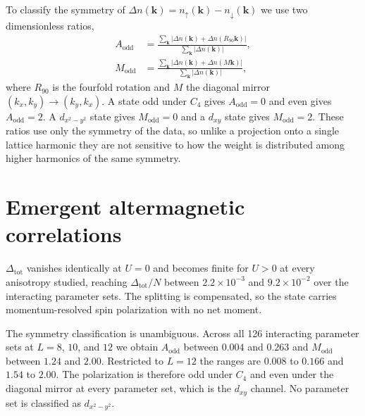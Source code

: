 \documentclass[aps,prb,reprint,superscriptaddress,amsmath,amssymb,floatfix]{revtex4-2}
\begin{document}
To classify the symmetry of $\Delta n(\bm{k}) = n_{\uparrow}(\bm{k}) - n_{\downarrow}(\bm{k})$
we use two dimensionless ratios,
\begin{align}
A_{\mathrm{odd}} &= \frac{\sum_{\bm{k}} \left| \Delta n(\bm{k}) + \Delta n(R_{90}\bm{k}) \right|}
                         {\sum_{\bm{k}} \left| \Delta n(\bm{k}) \right|},
\label{eq:aodd}\\
M_{\mathrm{odd}} &= \frac{\sum_{\bm{k}} \left| \Delta n(\bm{k}) + \Delta n(M\bm{k}) \right|}
                         {\sum_{\bm{k}} \left| \Delta n(\bm{k}) \right|},
\label{eq:modd}
\end{align}
where $R_{90}$ is the fourfold rotation and $M$ the diagonal mirror
$(k_x,k_y) \to (k_y,k_x)$. A state odd under $C_4$ gives
$A_{\mathrm{odd}} = 0$ and even gives $A_{\mathrm{odd}} = 2$. A $d_{x^2-y^2}$
state gives $M_{\mathrm{odd}} = 0$ and a $d_{xy}$ state gives
$M_{\mathrm{odd}} = 2$. These ratios use only the symmetry of the data, so
unlike a projection onto a single lattice harmonic they are not sensitive to
how the weight is distributed among higher harmonics of the same symmetry.


\section{Emergent altermagnetic correlations}
\label{sec:order}

$\Delta_{\mathrm{tot}}$ vanishes identically at $U = 0$ and becomes finite for
$U > 0$ at every anisotropy studied, reaching $\Delta_{\mathrm{tot}}/N$ between
$2.2\times10^{-3}$ and $9.2\times10^{-2}$ over the interacting parameter sets.
The splitting is compensated, so the state carries momentum-resolved spin
polarization with no net moment.

The symmetry classification is unambiguous. Across all 126 interacting parameter
sets at $L = 8$, $10$, and $12$ we obtain $A_{\mathrm{odd}}$ between $0.004$ and
$0.263$ and $M_{\mathrm{odd}}$ between $1.24$ and $2.00$.
Restricted to $L = 12$ the ranges are $0.008$ to $0.166$ and $1.54$ to $2.00$.
The polarization is therefore odd under $C_4$ and even under the diagonal
mirror at every parameter set, which is the $d_{xy}$ channel. No parameter set
is classified as $d_{x^2-y^2}$.
\end{document}
